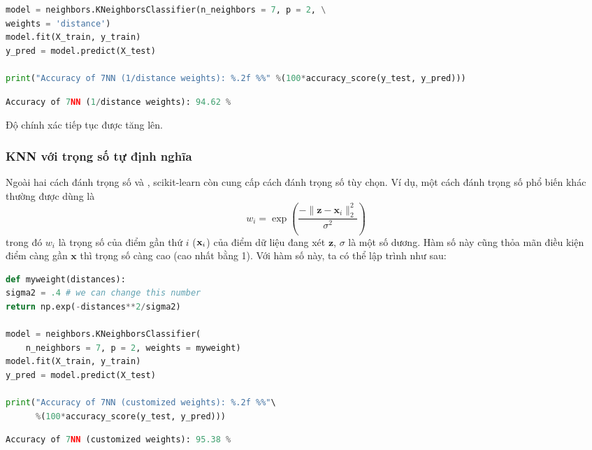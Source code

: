 \begin{lstlisting}[language=Python]
model = neighbors.KNeighborsClassifier(n_neighbors = 7, p = 2, \
weights = 'distance')
model.fit(X_train, y_train)
y_pred = model.predict(X_test)

print("Accuracy of 7NN (1/distance weights): %.2f %%" %(100*accuracy_score(y_test, y_pred)))
\end{lstlisting}
\kq
\begin{lstlisting}[language=Python]
Accuracy of 7NN (1/distance weights): 94.62 %
\end{lstlisting}



Độ chính xác tiếp tục được tăng lên.

\subsubsection{KNN với trọng số tự định nghĩa}
Ngoài hai cách đánh trọng số  và , scikit-learn còn cung
cấp cách đánh trọng số tùy chọn. Ví dụ, một cách
đánh trọng số phổ biến khác thường được dùng là
\begin{equation*}
w_i = \exp \left( \frac{-\|\mathbf{z} - \mathbf{x}_i\|_2^2}{\sigma^2}
\right)
\end{equation*}
trong đó $w_i$ là trọng số của điểm gần thứ $i$ ($\mathbf{x}_i$) của điểm dữ liệu
đang xét $\mathbf{z}$, $\sigma$ là một số dương. Hàm số này cũng
thỏa mãn
điều kiện điểm càng gần $\mathbf{x}$ thì trọng số càng cao (cao nhất bằng 1).
Với hàm số này, ta có thể lập trình như sau:


\begin{lstlisting}[language=Python]
def myweight(distances):
sigma2 = .4 # we can change this number
return np.exp(-distances**2/sigma2)

model = neighbors.KNeighborsClassifier(
    n_neighbors = 7, p = 2, weights = myweight)
model.fit(X_train, y_train)
y_pred = model.predict(X_test)

print("Accuracy of 7NN (customized weights): %.2f %%"\
      %(100*accuracy_score(y_test, y_pred)))
\end{lstlisting}
\kq
\begin{lstlisting}[language=Python]
Accuracy of 7NN (customized weights): 95.38 %
\end{lstlisting}

